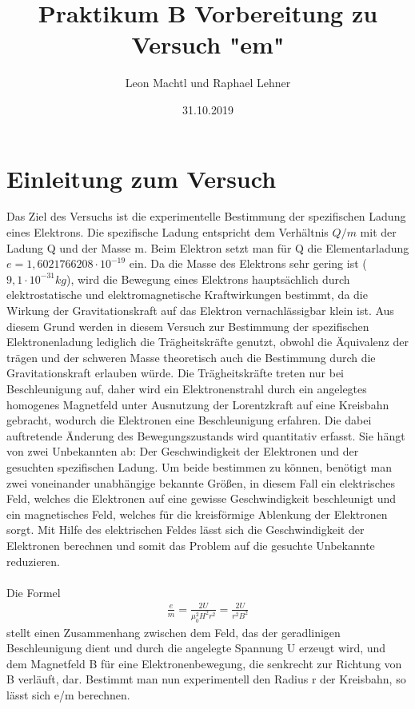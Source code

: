 \documentclass[a4paper,10pt]{scrartcl}
\title{Praktikum B Vorbereitung zu Versuch "em"}
\author{Leon Machtl und Raphael Lehner}
\date{31.10.2019}
\begin{document}
	\maketitle
	\tableofcontents
	\newpage
	
	\section{Einleitung zum Versuch}
	
	Das Ziel des Versuchs ist die experimentelle Bestimmung der spezifischen Ladung eines Elektrons. Die spezifische Ladung entspricht dem Verhältnis $Q/m$ mit der Ladung Q und der Masse m. Beim Elektron setzt man für Q die Elementarladung $e=1,6021766208\cdot 10^{-19}$ ein. Da die Masse des Elektrons sehr gering ist ($9,1 \cdot 10^{-31}kg$), wird die Bewegung eines Elektrons hauptsächlich durch elektrostatische und elektromagnetische Kraftwirkungen bestimmt, da die Wirkung der Gravitationskraft auf das Elektron vernachlässigbar klein ist. Aus diesem Grund werden in diesem Versuch zur Bestimmung der spezifischen Elektronenladung lediglich die Trägheitskräfte genutzt, obwohl die Äquivalenz der trägen und der schweren Masse theoretisch auch die Bestimmung durch die Gravitationskraft erlauben würde. Die Trägheitskräfte treten nur bei Beschleunigung auf, daher wird ein Elektronenstrahl durch ein angelegtes homogenes Magnetfeld unter Ausnutzung der Lorentzkraft auf eine Kreisbahn gebracht, wodurch die Elektronen eine Beschleunigung erfahren. Die dabei auftretende Änderung des Bewegungszustands wird quantitativ erfasst. Sie hängt von zwei Unbekannten ab: Der Geschwindigkeit der Elektronen und der gesuchten spezifischen Ladung. Um beide bestimmen zu können, benötigt man zwei voneinander unabhängige bekannte Größen, in diesem Fall ein elektrisches Feld, welches die Elektronen auf eine gewisse Geschwindigkeit beschleunigt und ein magnetisches Feld, welches für die kreisförmige Ablenkung der Elektronen sorgt. Mit Hilfe des elektrischen Feldes lässt sich die Geschwindigkeit der Elektronen berechnen und somit das Problem auf die gesuchte Unbekannte reduzieren.\\
	\\
	Die Formel 
	\begin{align}
	\frac{e}{m}=\frac{2U}{\mu_{0}^2H^2r^2}=\frac{2U}{r^2B^2}
	\end{align}
	stellt einen Zusammenhang zwischen dem Feld, das der geradlinigen Beschleunigung dient und durch die angelegte Spannung U erzeugt wird, und dem Magnetfeld B für eine Elektronenbewegung, die senkrecht zur Richtung von B verläuft, dar. Bestimmt man nun experimentell den Radius r der Kreisbahn, so lässt sich e/m berechnen.
	
\end{document}
